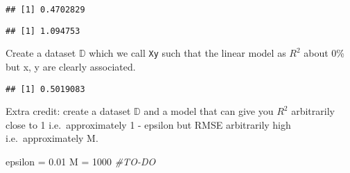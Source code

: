 \documentclass[
]{article}
\newenvironment{Shaded}{\begin{snugshade}}{\end{snugshade}}
\newcommand{\AttributeTok}[1]{\textcolor[rgb]{0.77,0.63,0.00}{#1}}
\newcommand{\CommentTok}[1]{\textcolor[rgb]{0.56,0.35,0.01}{\textit{#1}}}
\newcommand{\DecValTok}[1]{\textcolor[rgb]{0.00,0.00,0.81}{#1}}
\newcommand{\FloatTok}[1]{\textcolor[rgb]{0.00,0.00,0.81}{#1}}
\newcommand{\FunctionTok}[1]{\textcolor[rgb]{0.00,0.00,0.00}{#1}}
\newcommand{\NormalTok}[1]{#1}
\newcommand{\OtherTok}[1]{\textcolor[rgb]{0.56,0.35,0.01}{#1}}
\newcommand{\SpecialCharTok}[1]{\textcolor[rgb]{0.00,0.00,0.00}{#1}}
\begin{document}
\begin{verbatim}
## [1] 0.4702829
\end{verbatim}

\begin{Shaded}
\end{Shaded}

\begin{verbatim}
## [1] 1.094753
\end{verbatim}

Create a dataset \(\mathbb{D}\) which we call \texttt{Xy} such that the
linear model as \(R^2\) about 0\% but x, y are clearly associated.

\begin{Shaded}
\end{Shaded}

\begin{verbatim}
## [1] 0.5019083
\end{verbatim}

Extra credit: create a dataset \(\mathbb{D}\) and a model that can give
you \(R^2\) arbitrarily close to 1 i.e.~approximately 1 - epsilon but
RMSE arbitrarily high i.e.~approximately M.

\begin{Shaded}
\begin{Highlighting}[]
\NormalTok{epsilon }\OtherTok{=} \FloatTok{0.01}
\NormalTok{M }\OtherTok{=} \DecValTok{1000}
\CommentTok{\#TO{-}DO}
\end{Highlighting}
\end{Shaded}
\end{document}
